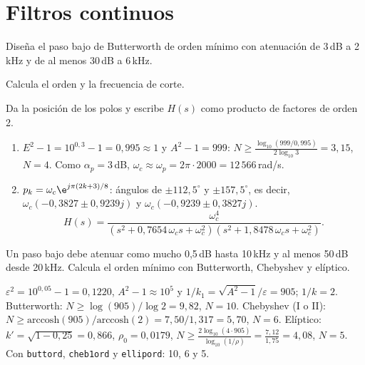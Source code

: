 \documentclass[11pt,a4paper]{scrartcl}
\begin{document}
\section*{Filtros continuos}

\begin{ejercicio}[Butterworth]
  Diseña el paso bajo de Butterworth de orden mínimo con atenuación de 3\,dB a 2\,kHz y de al menos 30\,dB a 6\,kHz.
  \begin{incisos}[1]
    \item Calcula el orden y la frecuencia de corte.
    \item Da la posición de los polos y escribe $H(s)$ como producto de factores de orden 2.
  \end{incisos}
\end{ejercicio}
\begin{solucion}
  \begin{enumerate}[label=\alph*)]
    \item $E^2-1=10^{0,3}-1=0{,}995\approx1$ y $A^2-1=999$: $N\ge\frac{\log_{10}(999/0{,}995)}{2\log_{10}3}=3{,}15$, $N=4$. Como $\alpha_p=3$\,dB, $\omega_c\approx\omega_p=2\pi\cdot2000=12\,566$\,rad/s.
    \item $p_k=\omega_c\e^{j\pi(2k+3)/8}$: ángulos de $\pm112{,}5^\circ$ y $\pm157{,}5^\circ$, es decir, $\omega_c(-0{,}3827\pm0{,}9239j)$ y $\omega_c(-0{,}9239\pm0{,}3827j)$.
    \[
      H(s)=\frac{\omega_c^4}{(s^2+0{,}7654\,\omega_cs+\omega_c^2)(s^2+1{,}8478\,\omega_cs+\omega_c^2)}.
    \]
  \end{enumerate}
\end{solucion}

\begin{ejercicio}
  Un paso bajo debe atenuar como mucho 0,5\,dB hasta 10\,kHz y al menos 50\,dB desde 20\,kHz. Calcula el orden mínimo con Butterworth, Chebyshev y elíptico.
\end{ejercicio}
\begin{solucion}
  $\varepsilon^2=10^{0,05}-1=0{,}1220$, $A^2-1\approx10^5$ y $1/k_1=\sqrt{A^2-1}/\varepsilon=905$; $1/k=2$.
  Butterworth: $N\ge\log(905)/\log2=9{,}82$, $N=10$. Chebyshev (I o II): $N\ge\mathrm{arccosh}(905)/\mathrm{arccosh}(2)=7{,}50/1{,}317=5{,}70$, $N=6$. Elíptico: $k'=\sqrt{1-0{,}25}=0{,}866$, $\rho_0=0{,}0179$, $N\ge\frac{2\log_{10}(4\cdot905)}{\log_{10}(1/\rho)}=\frac{7{,}12}{1{,}75}=4{,}08$, $N=5$. Con \texttt{buttord}, \texttt{cheb1ord} y \texttt{ellipord}: 10, 6 y 5.
\end{solucion}
\end{document}
